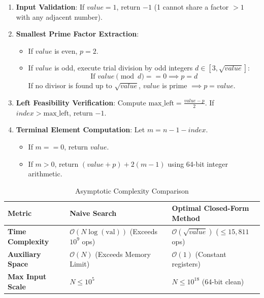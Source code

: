 \documentclass[10pt,journal,compsoc,onecolumn]{IEEEtran}
\begin{document}
\begin{enumerate}
    \item \textbf{Input Validation}: If $value = 1$, return $-1$ (1 cannot share a factor $> 1$ with any adjacent number).
    \item \textbf{Smallest Prime Factor Extraction}:
    \begin{itemize}
        \item If $value$ is even, $p = 2$.
        \item If $value$ is odd, execute trial division by odd integers $d \in [3, \sqrt{value}]$:
        \begin{equation}
        \text{If } value \pmod d == 0 \implies p = d
        \end{equation}
        If no divisor is found up to $\sqrt{value}$, $value$ is prime $\implies p = value$.
    \end{itemize}
    \item \textbf{Left Feasibility Verification}:
    Compute $\text{max\_left} = \frac{value - p}{2}$. If $index > \text{max\_left}$, return $-1$.
    \item \textbf{Terminal Element Computation}:
    Let $m = n - 1 - index$.
    \begin{itemize}
        \item If $m == 0$, return $value$.
        \item If $m > 0$, return $(value + p) + 2(m - 1)$ using 64-bit integer arithmetic.
    \end{itemize}
\end{enumerate}

\begin{table}[htbp]
\caption{Asymptotic Complexity Comparison}
\label{tab:complexity}
\centering
\begin{tabular}{lll}
\toprule
\textbf{Metric} & \textbf{Naive Search} & \textbf{Optimal Closed-Form Method} \\
\midrule
\textbf{Time Complexity} & $\mathcal{O}(N \log(\text{val}))$ (Exceeds $10^9$ ops) & $\mathcal{O}(\sqrt{value})$ ($\le 15,811$ ops) \\
\textbf{Auxiliary Space} & $\mathcal{O}(N)$ (Exceeds Memory Limit) & $\mathcal{O}(1)$ (Constant registers) \\
\textbf{Max Input Scale} & $N \le 10^5$ & $N \le 10^{18}$ (64-bit clean) \\
\bottomrule
\end{tabular}
\end{table}

\end{document}
